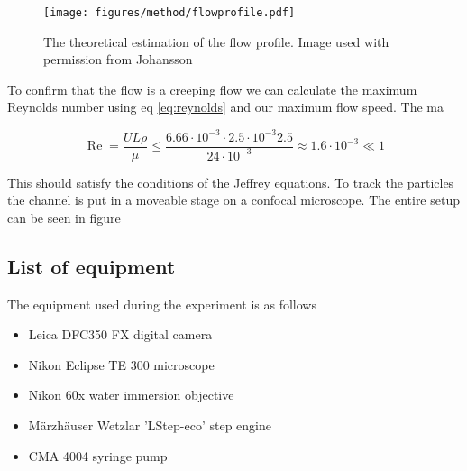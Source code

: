 



\begin{figure}[H]
\begin{center}
\texttt{[image: figures/method/flowprofile.pdf]}
\end{center}
\caption{The theoretical estimation of the flow profile. Image used with permission from Johansson \cite{AntonThesis}}
\label{fig:flowprofile}
\end{figure}


To confirm that the flow is a creeping flow we can calculate the maximum Reynolds number using eq \ref{eq:reynolds} and 
our maximum flow speed. The ma

\begin{equation}
\operatorname{Re} = \frac{U L \rho}{\mu} 
\leq \frac{6.66\cdot 10^{-3} \cdot 2.5 \cdot 10^{-3} 2.5 }{24 \cdot 10^{-3}} 
\approx	 	1.6  \cdot 10^{-3} \ll 1
\end{equation}

This should satisfy the conditions of the Jeffrey equations. To track the particles the channel is put in a moveable stage on a confocal microscope. The entire setup can be seen in figure 



\subsection{List of equipment}
 The equipment used during the experiment is as follows
\begin{itemize}
\item Leica DFC350 FX digital camera 
\item Nikon Eclipse TE 300 microscope
\item Nikon 60x water immersion objective
\item Märzhäuser Wetzlar 'LStep-eco' step engine
\item CMA 4004 syringe pump
\end{itemize}

%
%
